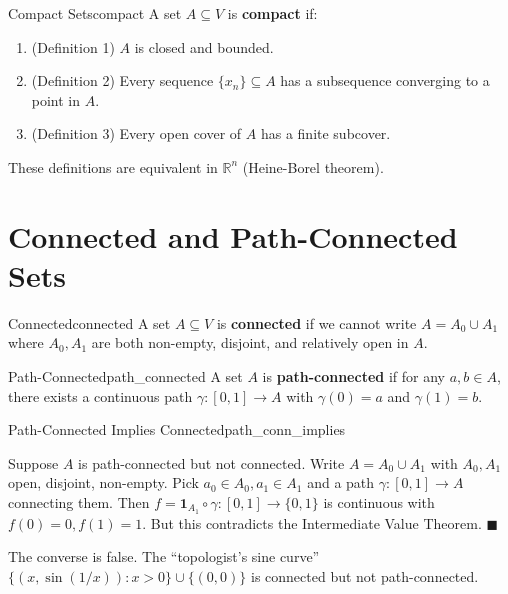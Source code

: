 \documentclass[11pt, letterpaper, openany]{book}
\renewenvironment{proof}[1][\proofname]{%
  \tcolorbox[blanker, breakable, left=1em,
    before skip=1em, after skip=1em,
    borderline west={2pt}{0pt}{MagicTeal!50},
    colback=MagicCream,
    before upper={\textcolor{MagicTeal}{\sffamily\bfseries #1.}\space}
  ]%
}{%
  \hfill\textcolor{MagicTeal}{\ensuremath{\blacksquare}}\endtcolorbox%
}
\begin{document}
\begin{defn}{Compact Sets}{compact}
A set $A \subseteq V$ is \textbf{compact} if:
\begin{enumerate}
    \item (Definition 1) $A$ is closed and bounded.
    \item (Definition 2) Every sequence $\{x_n\} \subseteq A$ has a subsequence converging to a point in $A$.
    \item (Definition 3) Every open cover of $A$ has a finite subcover.
\end{enumerate}
These definitions are equivalent in $\mathbb{R}^n$ (Heine-Borel theorem).
\end{defn}

\section{Connected and Path-Connected Sets}

\begin{defn}{Connected}{connected}
A set $A \subseteq V$ is \textbf{connected} if we cannot write $A = A_0 \cup A_1$ where $A_0, A_1$ are both non-empty, disjoint, and relatively open in $A$.
\end{defn}

\begin{defn}{Path-Connected}{path_connected}
A set $A$ is \textbf{path-connected} if for any $a, b \in A$, there exists a continuous path $\gamma: [0,1] \to A$ with $\gamma(0) = a$ and $\gamma(1) = b$.
\end{defn}

\begin{thm}{Path-Connected Implies Connected}{path_conn_implies}
\end{thm}

\begin{proof}
Suppose $A$ is path-connected but not connected. Write $A = A_0 \cup A_1$ with $A_0, A_1$ open, disjoint, non-empty. Pick $a_0 \in A_0, a_1 \in A_1$ and a path $\gamma: [0,1] \to A$ connecting them. Then $f = \mathbf{1}_{A_1} \circ \gamma: [0,1] \to \{0,1\}$ is continuous with $f(0) = 0, f(1) = 1$. But this contradicts the Intermediate Value Theorem.
\end{proof}

\begin{remark}
The converse is false. The ``topologist's sine curve'' $\{(x, \sin(1/x)) : x > 0\} \cup \{(0,0)\}$ is connected but not path-connected.
\end{remark}
\end{document}
